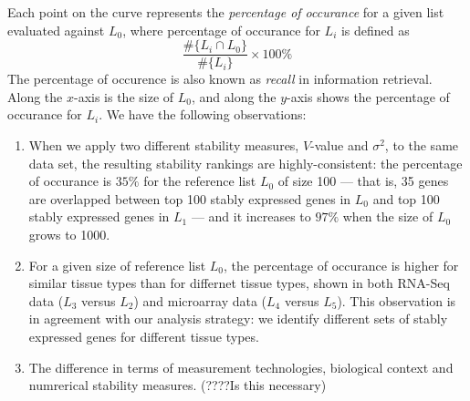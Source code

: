 \documentclass[11pt, a4paper]{article}
\begin{document}
Each point on the curve represents the \textit{percentage of occurance} for a given list evaluated against $L_0$, 
where percentage of occurance for $L_i$ is defined as 
 \[ \frac{ \#	 \{L_i\cap L_0\}}{\# \{L_i\}}\times 100\%\]
 The percentage of occurence is also known as \textit{recall} in
information retrieval.  Along the $x$-axis is the size of $L_0$, and along
the $y$-axis shows the percentage of occurance for $L_i$.  
We have the following observations:
\begin{enumerate}
    \item
	When we apply two different stability measures, $V$-value and $\sigma^2$, to the same data set, the resulting stability rankings are
	highly-consistent: the percentage of occurance is $35\%$ for the reference list $L_0$ of size 100 --- that is, 35 genes are overlapped between top 100 stably expressed genes in $L_0$ and top 100 stably expressed genes in $L_1$ --- and it increases to $97\%$ when the size of $L_0$ grows to 1000.
    \item For a given size of reference list $L_0$, the percentage of occurance is higher for similar tissue types than for differnet tissue types, shown in both RNA-Seq data ($L_3$ versus $L_2$) and microarray data ($L_4$ versus $L_5$). This observation is in agreement with our analysis strategy: we identify
    different sets of stably expressed genes for different tissue types.
    \item The difference in terms of  measurement technologies, biological context and numrerical stability measures. (????Is this necessary)
\end{enumerate}


\end{document}
